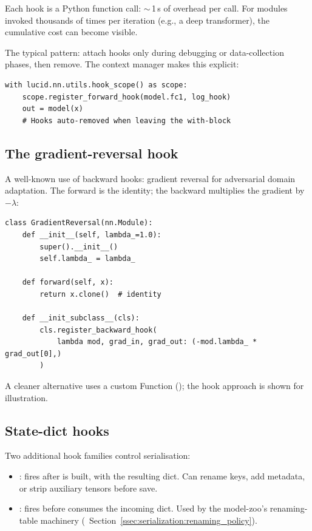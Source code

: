 Each hook is a Python function call: $\sim$\,1\,\textmu s
of overhead per call. For modules invoked thousands of times
per iteration (e.g., a deep transformer), the cumulative cost
can become visible.

The typical pattern: attach hooks only during debugging or
data-collection phases, then remove. The
 context manager makes this
explicit:

\begin{lstlisting}[style=lucid,language=LucidPython]
with lucid.nn.utils.hook_scope() as scope:
    scope.register_forward_hook(model.fc1, log_hook)
    out = model(x)
    # Hooks auto-removed when leaving the with-block
\end{lstlisting}

\subsection{The gradient-reversal hook}
\label{ssec:module_system:grad_reversal}

A well-known use of backward hooks: gradient reversal for
adversarial domain adaptation. The forward is the identity;
the backward multiplies the gradient by $-\lambda$:

\begin{lstlisting}[style=lucid,language=LucidPython]
class GradientReversal(nn.Module):
    def __init__(self, lambda_=1.0):
        super().__init__()
        self.lambda_ = lambda_

    def forward(self, x):
        return x.clone()  # identity

    def __init_subclass__(cls):
        cls.register_backward_hook(
            lambda mod, grad_in, grad_out: (-mod.lambda_ * grad_out[0],)
        )
\end{lstlisting}

A cleaner alternative uses a custom Function
(); the hook approach is shown for
illustration.

\subsection{State-dict hooks}
\label{ssec:module_system:state_dict_hooks}

Two additional hook families control serialisation:

\begin{itemize}
  \item {}: fires after
     is built, with the resulting dict.
    Can rename keys, add metadata, or strip auxiliary
    tensors before save.
  \item {}:
    fires before  consumes the
    incoming dict. Used by the model-zoo's renaming-table
    machinery (~Section~\ref{ssec:serialization:renaming_policy}).
\end{itemize}

